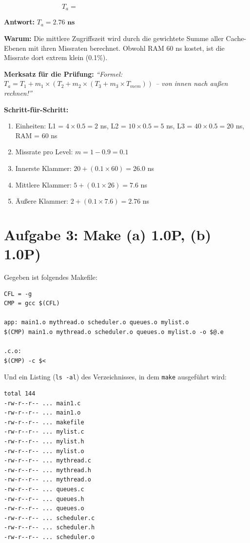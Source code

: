 \documentclass[a4paper,11pt]{article}
\begin{document}
\[
T_a = \hspace{7cm}
\]

\begin{tcolorbox}[colback=green!15!white,colframe=green!70!black,title=\textbf{Lösung Aufgabe 2}]
\textbf{Antwort:} $T_a = \mathbf{2.76 \text{ ns}}$

\textbf{Warum:} Die mittlere Zugriffszeit wird durch die gewichtete Summe aller Cache-Ebenen mit ihren Missraten berechnet. Obwohl RAM 60 ns kostet, ist die Missrate dort extrem klein (0.1\%).

\textbf{Merksatz für die Prüfung:} \textit{``Formel: $T_a = T_1 + m_1 \times (T_2 + m_2 \times (T_3 + m_3 \times T_{mem}))$ -- von innen nach außen rechnen!''}

\textbf{Schritt-für-Schritt:}
\begin{enumerate}[leftmargin=*]
  \item Einheiten: L1 = $4 \times 0.5 = 2$ ns, L2 = $10 \times 0.5 = 5$ ns, L3 = $40 \times 0.5 = 20$ ns, RAM = 60 ns
  \item Missrate pro Level: $m = 1 - 0.9 = 0.1$
  \item Innerste Klammer: $20 + (0.1 \times 60) = 26.0$ ns
  \item Mittlere Klammer: $5 + (0.1 \times 26) = 7.6$ ns
  \item Äußere Klammer: $2 + (0.1 \times 7.6) = 2.76$ ns
\end{enumerate}
\end{tcolorbox}

\section{Aufgabe 3: Make (a) 1.0P, (b) 1.0P)}
Gegeben ist folgendes Makefile:

\begin{verbatim}
CFL = -g
CMP = gcc $(CFL)

app: main1.o mythread.o scheduler.o queues.o mylist.o
$(CMP) main1.o mythread.o scheduler.o queues.o mylist.o -o $@.e

.c.o:
$(CMP) -c $<
\end{verbatim}

Und ein Listing (\texttt{ls -al}) des Verzeichnisses, in dem \texttt{make} ausgeführt wird:

\begin{verbatim}
total 144
-rw-r--r-- ... main1.c
-rw-r--r-- ... main1.o
-rw-r--r-- ... makefile
-rw-r--r-- ... mylist.c
-rw-r--r-- ... mylist.h
-rw-r--r-- ... mylist.o
-rw-r--r-- ... mythread.c
-rw-r--r-- ... mythread.h
-rw-r--r-- ... mythread.o
-rw-r--r-- ... queues.c
-rw-r--r-- ... queues.h
-rw-r--r-- ... queues.o
-rw-r--r-- ... scheduler.c
-rw-r--r-- ... scheduler.h
-rw-r--r-- ... scheduler.o
\end{verbatim}
\end{document}
